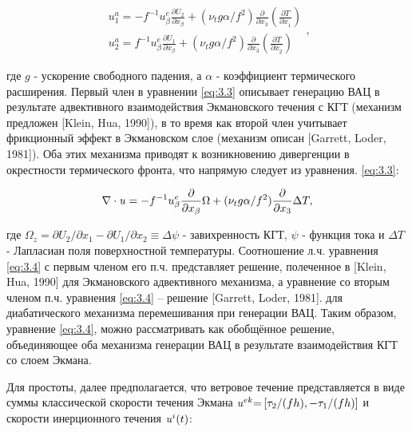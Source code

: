 \begin{equation} \label{eq:3.3} \begin{array}{l} {u_{1}^{a} =-f^{-1} u_{\beta }^{e} \frac{\partial U_{2} }{\partial x_{\beta } } +(\nu _{t} g\alpha /f^{2} )\frac{\partial }{\partial x_{3} } \left(\frac{\partial T}{\partial x_{1}^{} } \right)} \\ {u_{2}^{a} =f^{-1} u_{\beta }^{e} \frac{\partial U_{1} }{\partial x_{\beta } } +(\nu _{t} g\alpha /f^{2} )\frac{\partial }{\partial x_{3} } \left(\frac{\partial T}{\partial x_{2}^{} } \right)} \end{array},  \end{equation} 



\noindent где $g$ - ускорение свободного падения, а $\alpha $ - коэффициент термического расширения. Первый член в уравнении \eqref{eq:3.3} описывает генерацию ВАЦ в результате адвективного взаимодействия Экмановского течения с КГТ (механизм предложен [Klein, Hua, 1990]), в то время как второй член учитывает фрикционный эффект в Экмановском слое (механизм описан [Garrett, Loder, 1981]). Оба этих механизма приводят к возникновению дивергенции в окрестности термического фронта, что напрямую следует из уравнения. \eqref{eq:3.3}:



\begin{equation} \label{eq:3.4} \nabla \cdot {\it u}=-f^{-1} u_{\beta }^{e} \frac{\partial }{\partial x_{\beta } } \Omega +(\nu _{t} g\alpha /f^{2} )\frac{\partial }{\partial x_{3} } \Delta T,  \end{equation} 



\noindent где $\Omega _{z} =\partial U_{2} /\partial x_{1} -\partial U_{1} /\partial x_{2} \equiv \Delta \psi $ - завихренность КГТ, $\psi $ - функция тока и $\Delta T$ - Лапласиан поля поверхностной температуры. Соотношение л.ч. уравнения \eqref{eq:3.4} с первым членом его п.ч. представляет решение, полеченное в [Klein, Hua, 1990] для Экмановского адвективного механизма, а уравнение со вторым членом п.ч. уравнения \eqref{eq:3.4} -- решение [Garrett, Loder, 1981]. для диабатического механизма перемешивания при генерации ВАЦ. Таким образом, уравнение \eqref{eq:3.4}, можно рассматривать как обобщённое решение, объединяющее оба механизма генерации ВАЦ в результате взаимодействия КГТ со слоем Экмана.

Для простоты, далее предполагается, что ветровое течение представляется в виде суммы классической скорости течения Экмана ${\it u}^{ek} {\it =}\left[\tau _{2} /(fh),-\tau _{1} /(fh)\right]$ и скорости инерционного течения ${\it u}^{i} (t)$:



